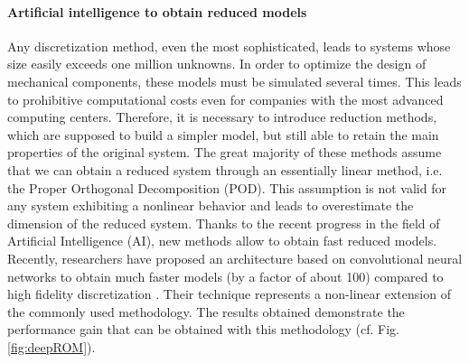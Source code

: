 \documentclass[12pt]{article}
\begin{document}
	\paragraph{\large Artificial intelligence to obtain reduced models}
	Any discretization method, even the most sophisticated, leads to systems whose size easily exceeds one million unknowns. In order to optimize the design of mechanical components, these models must be simulated several times. This leads to prohibitive computational costs even for companies with the most advanced computing centers. Therefore, it is necessary to introduce reduction methods, which are supposed to build a simpler model, but still able to retain the main properties of the original system. The great majority of these methods assume that we can obtain a reduced system through an essentially linear method, i.e. the Proper Orthogonal Decomposition (POD). This assumption is not valid for any system exhibiting a nonlinear behavior and leads to overestimate the dimension of the reduced system. Thanks to the recent progress in the field of Artificial Intelligence (AI), new methods allow to obtain fast reduced models. Recently, researchers have proposed an architecture based on convolutional neural networks to obtain much faster models (by a factor of about 100) compared to high fidelity discretization \cite{lee2020}. Their technique represents a non-linear extension of the commonly used methodology. The results obtained demonstrate the performance gain that can be obtained with this methodology (cf. Fig. \ref{fig:deepROM}).
	
\end{document}
